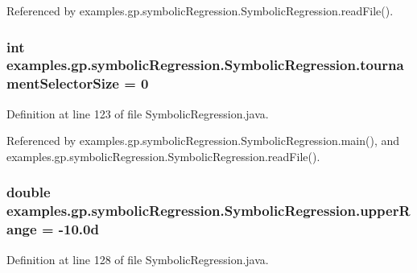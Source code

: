 Referenced by examples.\-gp.\-symbolic\-Regression.\-Symbolic\-Regression.\-read\-File().

\hypertarget{classexamples_1_1gp_1_1symbolic_regression_1_1_symbolic_regression_a916ced9e82e1dc1b31d3485d42cdf894}{
\subsubsection[{tournament\-Selector\-Size}]{\setlength{\rightskip}{0pt plus 5cm}int examples.\-gp.\-symbolic\-Regression.\-Symbolic\-Regression.\-tournament\-Selector\-Size = 0\hspace{0.3cm}{\ttfamily [static]}}}\label{classexamples_1_1gp_1_1symbolic_regression_1_1_symbolic_regression_a916ced9e82e1dc1b31d3485d42cdf894}


Definition at line 123 of file Symbolic\-Regression.\-java.



Referenced by examples.\-gp.\-symbolic\-Regression.\-Symbolic\-Regression.\-main(), and examples.\-gp.\-symbolic\-Regression.\-Symbolic\-Regression.\-read\-File().

\hypertarget{classexamples_1_1gp_1_1symbolic_regression_1_1_symbolic_regression_ab2b461c410629ea6a5309d6f59ccf7b3}{
\subsubsection[{upper\-Range}]{\setlength{\rightskip}{0pt plus 5cm}double examples.\-gp.\-symbolic\-Regression.\-Symbolic\-Regression.\-upper\-Range = -\/10.\-0d\hspace{0.3cm}{\ttfamily [static]}}}\label{classexamples_1_1gp_1_1symbolic_regression_1_1_symbolic_regression_ab2b461c410629ea6a5309d6f59ccf7b3}


Definition at line 128 of file Symbolic\-Regression.\-java.



